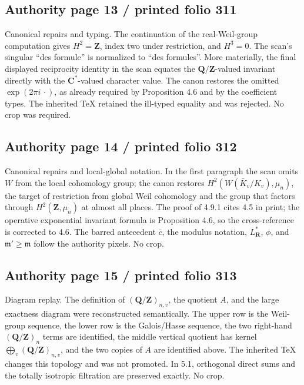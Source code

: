 \documentclass[10pt]{article}
\begin{document}
\subsection*{Authority page 13 / printed folio 311}

Canonical repairs and typing. The continuation of the real-Weil-group computation gives \(H^2=\mathbf Z\), index two under restriction, and \(H^3=0\). The scan’s singular “des formule” is normalized to “des formules”. More materially, the final displayed reciprocity identity in the scan equates the \(\mathbf Q/\mathbf Z\)-valued invariant directly with the \(\mathbf C^*\)-valued character value. The canon restores the omitted \(\exp(2\pi i\,\cdot)\), as already required by Proposition 4.6 and by the coefficient types. The inherited TeX retained the ill-typed equality and was rejected. No crop was required.\par

\subsection*{Authority page 14 / printed folio 312}

Canonical repairs and local-global notation. In the first paragraph the scan omits \(W\) from the local cohomology group; the canon restores \(H^2(W(\bar K_v/K_v),\mu_n)\), the target of restriction from global Weil cohomology and the group that factors through \(H^2(\mathbf Z,\mu_n)\) at almost all places. The proof of 4.9.1 cites 4.5 in print; the operative exponential invariant formula is Proposition 4.6, so the cross-reference is corrected to 4.6. The barred antecedent \(\bar c\), the modulus notation, \(L_{\mathbf R}^*\), \(\phi\), and \(\mathfrak m'\ge\mathfrak m\) follow the authority pixels. No crop.\par

\subsection*{Authority page 15 / printed folio 313}

Diagram replay. The definition of \((\mathbf Q/\mathbf Z)_{n,v}\), the quotient \(A\), and the large exactness diagram were reconstructed semantically. The upper row is the Weil-group sequence, the lower row is the Galois/Hasse sequence, the two right-hand \((\mathbf Q/\mathbf Z)_n\) terms are identified, the middle vertical quotient has kernel \(\bigoplus_v(\mathbf Q/\mathbf Z)_{n,v}\), and the two copies of \(A\) are identified above. The inherited TeX changes this topology and was not promoted. In 5.1, orthogonal direct sums and the totally isotropic filtration are preserved exactly. No crop.\par
\end{document}

